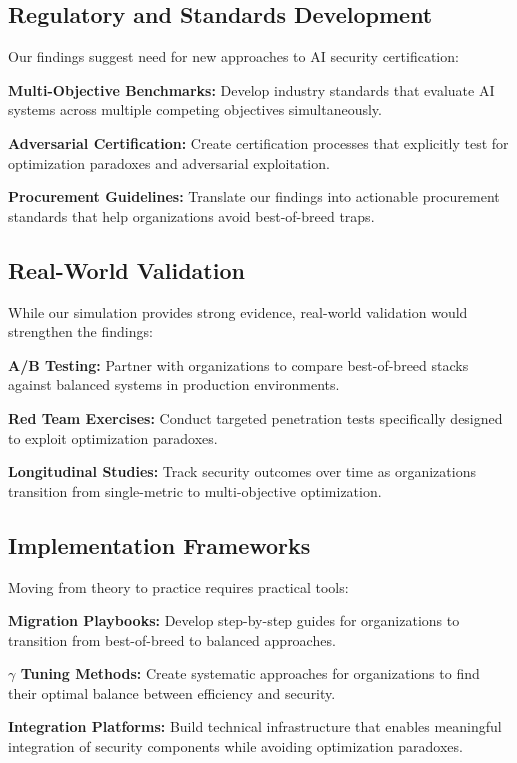 \documentclass[10pt,conference]{IEEEtran}
\begin{document}
\subsection{Regulatory and Standards Development}

Our findings suggest need for new approaches to AI security certification:

\textbf{Multi-Objective Benchmarks:} Develop industry standards that evaluate AI systems across multiple competing objectives simultaneously.

\textbf{Adversarial Certification:} Create certification processes that explicitly test for optimization paradoxes and adversarial exploitation.

\textbf{Procurement Guidelines:} Translate our findings into actionable procurement standards that help organizations avoid best-of-breed traps.

\subsection{Real-World Validation}

While our simulation provides strong evidence, real-world validation would strengthen the findings:

\textbf{A/B Testing:} Partner with organizations to compare best-of-breed stacks against balanced systems in production environments.

\textbf{Red Team Exercises:} Conduct targeted penetration tests specifically designed to exploit optimization paradoxes.

\textbf{Longitudinal Studies:} Track security outcomes over time as organizations transition from single-metric to multi-objective optimization.

\subsection{Implementation Frameworks}

Moving from theory to practice requires practical tools:

\textbf{Migration Playbooks:} Develop step-by-step guides for organizations to transition from best-of-breed to balanced approaches.

\textbf{$\gamma$ Tuning Methods:} Create systematic approaches for organizations to find their optimal balance between efficiency and security.

\textbf{Integration Platforms:} Build technical infrastructure that enables meaningful integration of security components while avoiding optimization paradoxes.
\end{document}

